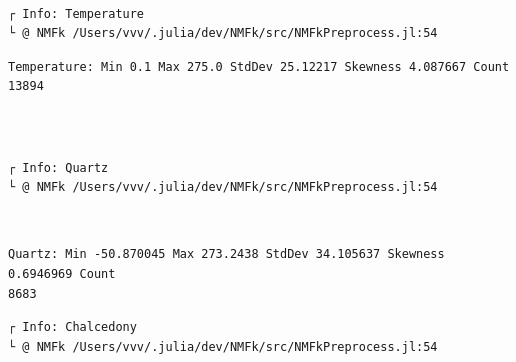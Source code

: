 \documentclass[11pt]{article}
\begin{document}
    \begin{center}
    \end{center}
    { \hspace*{\fill} \\}

    \begin{Verbatim}[commandchars=\\\{\}]
┌ Info: Temperature
└ @ NMFk /Users/vvv/.julia/dev/NMFk/src/NMFkPreprocess.jl:54
    \end{Verbatim}

    \begin{Verbatim}[commandchars=\\\{\}]
Temperature: Min 0.1 Max 275.0 StdDev 25.12217 Skewness 4.087667 Count 13894
    \end{Verbatim}

    \begin{center}
    \end{center}
    { \hspace*{\fill} \\}

    \begin{Verbatim}[commandchars=\\\{\}]

    \end{Verbatim}

    \begin{Verbatim}[commandchars=\\\{\}]
┌ Info: Quartz
└ @ NMFk /Users/vvv/.julia/dev/NMFk/src/NMFkPreprocess.jl:54
    \end{Verbatim}

    \begin{center}
    \end{center}
    { \hspace*{\fill} \\}

    \begin{Verbatim}[commandchars=\\\{\}]
Quartz: Min -50.870045 Max 273.2438 StdDev 34.105637 Skewness 0.6946969 Count
8683
    \end{Verbatim}

    \begin{Verbatim}[commandchars=\\\{\}]
┌ Info: Chalcedony
└ @ NMFk /Users/vvv/.julia/dev/NMFk/src/NMFkPreprocess.jl:54
    \end{Verbatim}
\end{document}
